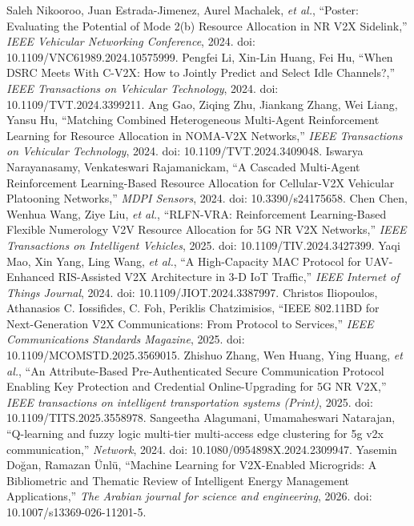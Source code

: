  Saleh Nikooroo, Juan Estrada-Jimenez, Aurel Machalek, \emph{et al.}, ``Poster: Evaluating the Potential of Mode 2(b) Resource Allocation in NR V2X Sidelink,'' \emph{IEEE Vehicular Networking Conference}, 2024. doi: 10.1109/VNC61989.2024.10575999.
 Pengfei Li, Xin-Lin Huang, Fei Hu, ``When DSRC Meets With C-V2X: How to Jointly Predict and Select Idle Channels?,'' \emph{IEEE Transactions on Vehicular Technology}, 2024. doi: 10.1109/TVT.2024.3399211.
 Ang Gao, Ziqing Zhu, Jiankang Zhang, Wei Liang, Yansu Hu, ``Matching Combined Heterogeneous Multi-Agent Reinforcement Learning for Resource Allocation in NOMA-V2X Networks,'' \emph{IEEE Transactions on Vehicular Technology}, 2024. doi: 10.1109/TVT.2024.3409048.
 Iswarya Narayanasamy, Venkateswari Rajamanickam, ``A Cascaded Multi-Agent Reinforcement Learning-Based Resource Allocation for Cellular-V2X Vehicular Platooning Networks,'' \emph{MDPI Sensors}, 2024. doi: 10.3390/s24175658.
 Chen Chen, Wenhua Wang, Ziye Liu, \emph{et al.}, ``RLFN-VRA: Reinforcement Learning-Based Flexible Numerology V2V Resource Allocation for 5G NR V2X Networks,'' \emph{IEEE Transactions on Intelligent Vehicles}, 2025. doi: 10.1109/TIV.2024.3427399.
 Yaqi Mao, Xin Yang, Ling Wang, \emph{et al.}, ``A High-Capacity MAC Protocol for UAV-Enhanced RIS-Assisted V2X Architecture in 3-D IoT Traffic,'' \emph{IEEE Internet of Things Journal}, 2024. doi: 10.1109/JIOT.2024.3387997.
 Christos Iliopoulos, Athanasios C. Iossifides, C. Foh, Periklis Chatzimisios, ``IEEE 802.11BD for Next-Generation V2X Communications: From Protocol to Services,'' \emph{IEEE Communications Standards Magazine}, 2025. doi: 10.1109/MCOMSTD.2025.3569015.
 Zhishuo Zhang, Wen Huang, Ying Huang, \emph{et al.}, ``An Attribute-Based Pre-Authenticated Secure Communication Protocol Enabling Key Protection and Credential Online-Upgrading for 5G NR V2X,'' \emph{IEEE transactions on intelligent transportation systems (Print)}, 2025. doi: 10.1109/TITS.2025.3558978.
 Sangeetha Alagumani, Umamaheswari Natarajan, ``Q-learning and fuzzy logic multi-tier multi-access edge clustering for 5g v2x communication,'' \emph{Network}, 2024. doi: 10.1080/0954898X.2024.2309947.
 Yasemin Doğan, Ramazan Ünlü, ``Machine Learning for V2X-Enabled Microgrids: A Bibliometric and Thematic Review of Intelligent Energy Management Applications,'' \emph{The Arabian journal for science and engineering}, 2026. doi: 10.1007/s13369-026-11201-5.

